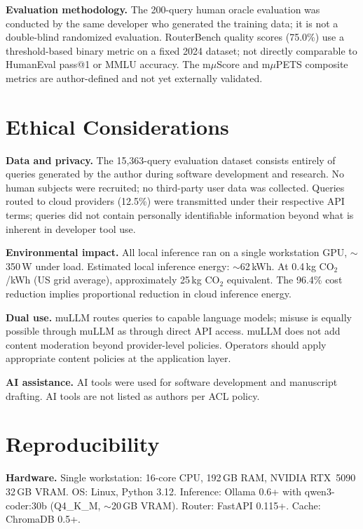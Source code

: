 \documentclass[11pt]{article}
\begin{document}
\textbf{Evaluation methodology.} The 200-query human oracle evaluation
was conducted by the same developer who generated the training data; it
is not a double-blind randomized evaluation. RouterBench quality scores
(75.0\%) use a threshold-based binary metric on a fixed 2024 dataset;
not directly comparable to HumanEval pass@1 or MMLU accuracy. The
m$\mu$Score and m$\mu$PETS composite metrics are author-defined and not
yet externally validated.

\section*{Ethical Considerations}

\textbf{Data and privacy.} The 15,363-query evaluation dataset consists
entirely of queries generated by the author during software development
and research. No human subjects were recruited; no third-party user data
was collected. Queries routed to cloud providers (12.5\%) were
transmitted under their respective API terms; queries did not contain
personally identifiable information beyond what is inherent in developer
tool use.

\textbf{Environmental impact.} All local inference ran on a single
workstation GPU, $\sim$350\,W under load. Estimated local inference
energy: $\sim$62\,kWh. At 0.4\,kg CO$_2$/kWh (US grid average),
approximately 25\,kg CO$_2$ equivalent. The 96.4\% cost reduction
implies proportional reduction in cloud inference energy.

\textbf{Dual use.} muLLM routes queries to capable language models;
misuse is equally possible through muLLM as through direct API access.
muLLM does not add content moderation beyond provider-level policies.
Operators should apply appropriate content policies at the application
layer.

\textbf{AI assistance.} AI tools were used for software development and
manuscript drafting. AI tools are not listed as authors per ACL policy.

\appendix

\section{Reproducibility}

\textbf{Hardware.} Single workstation: 16-core CPU, 192\,GB RAM, NVIDIA
RTX~5090 32\,GB VRAM. OS: Linux, Python 3.12. Inference: Ollama 0.6+
with qwen3-coder:30b (Q4\_K\_M, $\sim$20\,GB VRAM). Router: FastAPI
0.115+. Cache: ChromaDB 0.5+.
\end{document}
